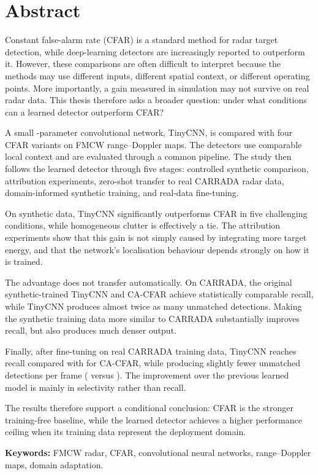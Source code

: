 \chapter*{Abstract}

\sloppy
Constant false-alarm rate (CFAR) is a standard method for radar target detection, while
deep-learning detectors are increasingly reported to outperform it. However, these comparisons are
often difficult to interpret because the methods may use different inputs, different spatial
context, or different operating points. More importantly, a gain measured in simulation may not
survive on real radar data. This thesis therefore asks a broader question: under what conditions can
a learned detector outperform CFAR?

A small \TinyParams{}-parameter convolutional network, TinyCNN, is compared with four CFAR variants
on FMCW range--Doppler maps. The detectors use comparable local context and are evaluated through a
common pipeline. The study then follows the learned detector through five stages: controlled
synthetic comparison, attribution experiments, zero-shot transfer to real CARRADA radar data,
domain-informed synthetic training, and real-data fine-tuning.

On synthetic data, TinyCNN significantly outperforms CFAR in five challenging conditions, while
homogeneous clutter is effectively a tie. The attribution experiments show that this gain is not
simply caused by integrating more target energy, and that the network's localisation behaviour
depends strongly on how it is trained.

The advantage does not transfer automatically. On CARRADA, the original synthetic-trained TinyCNN
and CA-CFAR achieve statistically comparable recall, while TinyCNN produces almost twice as many
unmatched detections. Making the synthetic training data more similar to CARRADA substantially
improves recall, but also produces much denser output.

Finally, after fine-tuning on real CARRADA training data, TinyCNN reaches \FtValFt{} recall compared
with \FtValCFAR{} for CA-CFAR, while producing slightly fewer unmatched detections per frame
(\FtValBurdenFt{} versus \FtValBurdenCFAR{}). The improvement over the previous learned model is
mainly in selectivity rather than recall.

The results therefore support a conditional conclusion: CFAR is the stronger training-free baseline,
while the learned detector achieves a higher performance ceiling when its training data represent
the deployment domain.

\noindent\textbf{Keywords:} FMCW radar, CFAR, convolutional neural networks, range--Doppler maps,
domain adaptation.
